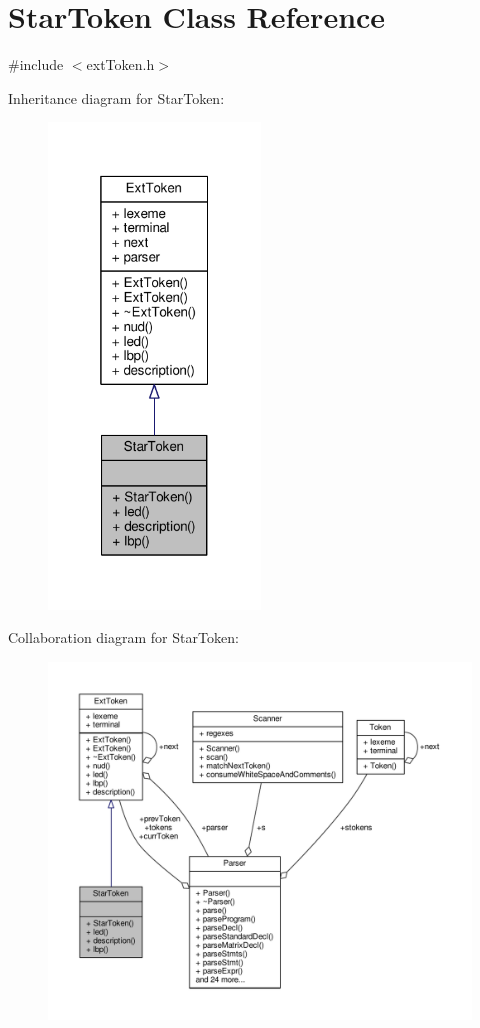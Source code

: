 \hypertarget{classStarToken}{\section{Star\-Token Class Reference}
\label{classStarToken}
}


{\ttfamily \#include $<$ext\-Token.\-h$>$}



Inheritance diagram for Star\-Token\-:\nopagebreak
\begin{figure}[H]
\begin{center}
\leavevmode
\includegraphics[width=160pt]{classStarToken__inherit__graph}
\end{center}
\end{figure}


Collaboration diagram for Star\-Token\-:\nopagebreak
\begin{figure}[H]
\begin{center}
\leavevmode
\includegraphics[width=350pt]{classStarToken__coll__graph}
\end{center}
\end{figure}
